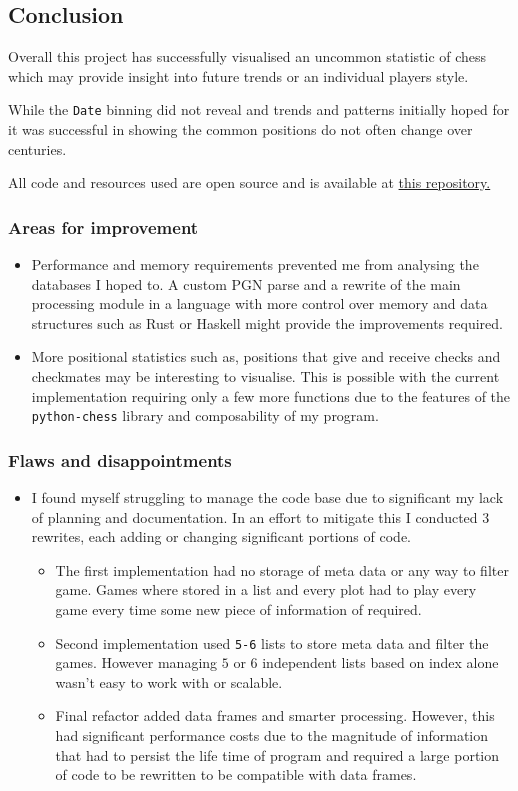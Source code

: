 \documentclass[11pt]{article}
\begin{document}
\subsection{Conclusion}
\label{sec:orge86b719}
Overall this project has successfully visualised an uncommon statistic of chess which may provide insight into future trends or an individual players style.

While the \texttt{Date} binning did not reveal and trends and patterns initially hoped for it was successful in showing the common positions do not often change over centuries.

All code and resources used are open source and is available at \href{https://github.com/Jake-Moss/chess-analysis}{this repository.}
\subsubsection{Areas for improvement}
\label{sec:org455a30f}
\begin{itemize}
\item Performance and memory requirements prevented me from analysing the databases I hoped to. A custom PGN parse and a rewrite of the main processing module in a language with more control over memory and data structures such as Rust or Haskell might provide the improvements required.
\item More positional statistics such as, positions that give and receive checks and checkmates may be interesting to visualise. This is possible with the current implementation requiring only a few more functions due to the features of the \texttt{python-chess} library and composability of my program.
\end{itemize}
\subsubsection{Flaws and disappointments}
\label{sec:orgc14c26e}
\begin{itemize}
\item I found myself struggling to manage the code base due to significant my lack of planning and documentation. In an effort to mitigate this I conducted 3 rewrites, each adding or changing significant portions of code.
\begin{itemize}
\item The first implementation had no storage of meta data or any way to filter game. Games where stored in a list and every plot had to play every game every time some new piece of information of required.
\item Second implementation used \texttt{5-6} lists to store meta data and filter the games. However managing \(5\) or \(6\) independent lists based on index alone wasn't easy to work with or scalable.
\item Final refactor added data frames and smarter processing. However, this had significant performance costs due to the magnitude of information that had to persist the life time of program and required a large portion of code to be rewritten to be compatible with data frames.
\end{itemize}
\end{itemize}
\end{document}
